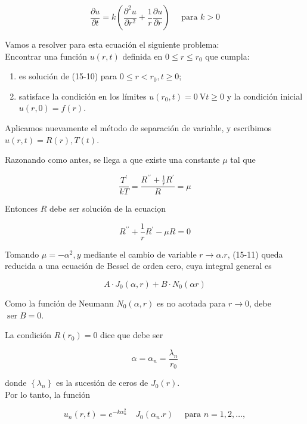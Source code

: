 \documentclass[10pt]{article}
\theoremstyle{plain}
\theoremstyle{definition}
\theoremstyle{remark}
\begin{document}
\begin{equation*}
\frac{\partial u}{\partial t}=k\left(\frac{\partial^{2} u}{\partial r^{2}}+\frac{1}{r} \frac{\partial u}{\partial r}\right) \quad \text { para } k>0 \tag{15-10}
\end{equation*}


Vamos a resolver para esta ecuación el siguiente problema:\\
Encontrar una función $u(r, t)$ definida en $0 \leqslant r \leqslant r_{0}$ que cumpla:

\begin{enumerate}
  \item es solución de (15-10) para $0 \leqslant r<r_{0}, t \geqslant 0$;
  \item satisface la condición en los límites $u\left(r_{0}, t\right)=0 \mathrm{~V} t \geqslant 0$ y la condición inicial $u(r, 0)=f(r)$.
\end{enumerate}

Aplicamos nuevamente el método de separación de variable, y escribimos $u(r, t)=R(r), T(t)$.

Razonando como antes, se llega a que existe una constante $\mu$ tal que

$$
\frac{T^{\prime}}{k T}=\frac{R^{\prime \prime}+\frac{1}{r} R^{\prime}}{R}=\mu
$$

Entonces $R$ debe ser solución de la ecuaciọn


\begin{equation*}
R^{\prime \prime}+\frac{1}{r} R^{\prime}-\mu R=0 \tag{$15\cdot11$}
\end{equation*}


Tomando $\mu=-\alpha^{2}, y$ mediante el cambio de variable $r \rightarrow \alpha . r$, (15-11) queda reducida a una ecuación de Bessel de orden cero, cuya integral general es

$$
A \cdot J_{0}(\alpha, r)+B \cdot N_{0}(\alpha r)
$$

Como la función de Neumann $N_{0}(\alpha, r)$ es no acotada para $r \rightarrow 0$, debe $\operatorname{ser} B=0$.

La condición $R\left(r_{0}\right)=0$ dice que debe ser

$$
\alpha=\alpha_{n}=\frac{\lambda_{n}}{r_{0}}
$$

donde $\left\{\lambda_{n}\right\}$ es la sucesión de ceros de $J_{0}(r)$.\\
Por lo tanto, la función

$$
u_{n}(r, t)=e^{-k \alpha_{n}^{2}} \quad J_{0}\left(\alpha_{n} . r\right) \quad \text { para } n=1,2, \ldots,
$$
\end{document}
